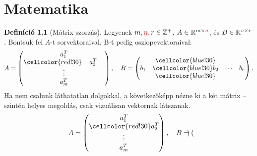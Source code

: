 \documentclass[twocolumn]{report}
\theoremstyle{definition} %
\newtheorem{defin}{Definíció} %
\begin{document}
\hulipsum

\chapter{Matematika}

\begin{defin}[Mátrix szorzás] %
Legyenek $m,\textcolor{red}{n},r \in \mathbb{Z}^+$, $A \in\mathbb{R}^{m\times \textcolor{red}{n}}$, és $B\in\mathbb{R}^{\textcolor{red}{n}\times r}$. Bontsuk fel $A$-t sorvektoraival, B-t pedig oszlopevektoraival:
\begin{equation} %
A = \begin{pmatrix} %
a_1^T \\
\cellcolor{red!30}\hphantom{a_2^T} a_2^T \hphantom{a_2^T}\\ 
\vdots \\
a_m^T 
\end{pmatrix}, 
\quad %
B = \begin{pmatrix}
 & \cellcolor{blue!30} \\
b_1 & \cellcolor{blue!30} b_2 & \cdots & b_r  \\
 & \cellcolor{blue!30} \\
\end{pmatrix}.
\end{equation}
{\color{gray} Ha nem csalunk láthatatlan dolgokkal, a következőképp nézne ki a két mátrix -- szintén helyes megoldás, csak vizuálisan vektornak látszanak.
\[ A = \begin{pmatrix}
a_1^T \\
\cellcolor{red!30} a_2^T \\ 
\vdots \\
a_m^T 
\end{pmatrix}, 
\quad 
B = \begin{pmatrix}

\end{pmatrix}\]}
\end{defin}
\end{document}
